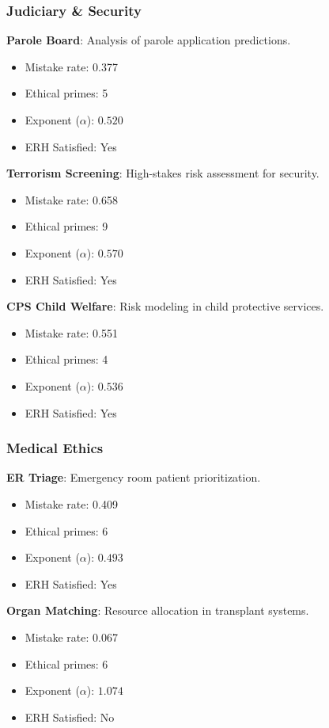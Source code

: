 \documentclass[12pt,a4paper]{article}
\theoremstyle{definition}
\theoremstyle{remark}
\begin{document}
\subsubsection{Judiciary \& Security}

\textbf{Parole Board}: Analysis of parole application predictions.
\begin{itemize}
    \item Mistake rate: 0.377
    \item Ethical primes: 5
    \item Exponent ($\alpha$): $0.520$
    \item ERH Satisfied: Yes
\end{itemize}

\textbf{Terrorism Screening}: High-stakes risk assessment for security.
\begin{itemize}
    \item Mistake rate: 0.658
    \item Ethical primes: 9
    \item Exponent ($\alpha$): $0.570$
    \item ERH Satisfied: Yes
\end{itemize}

\textbf{CPS Child Welfare}: Risk modeling in child protective services.
\begin{itemize}
    \item Mistake rate: 0.551
    \item Ethical primes: 4
    \item Exponent ($\alpha$): $0.536$
    \item ERH Satisfied: Yes
\end{itemize}

\subsubsection{Medical Ethics}

\textbf{ER Triage}: Emergency room patient prioritization.
\begin{itemize}
    \item Mistake rate: 0.409
    \item Ethical primes: 6
    \item Exponent ($\alpha$): $0.493$
    \item ERH Satisfied: Yes
\end{itemize}

\textbf{Organ Matching}: Resource allocation in transplant systems.
\begin{itemize}
    \item Mistake rate: 0.067
    \item Ethical primes: 6
    \item Exponent ($\alpha$): $1.074$
    \item ERH Satisfied: No
\end{itemize}
\end{document}
